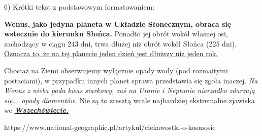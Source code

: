 6) Krótki tekst z podstawowym formatowaniem:

\textbf{Wenus, jako jedyna planeta w Układzie Słonecznym, obraca się wstecznie do kierunku Słońca.} Ponadto jej obrót wokół własnej osi, zachodzący w ciągu 243 dni, trwa dłużej niż obrót wokół Słońca (225 dni). \underline{Oznacza to, że na tej planecie jeden dzień jest dłuższy niż jeden rok.}

Chociaż na Ziemi obserwujemy wyłącznie opady wody (pod rozmaitymi postaciami), w przypadku innych planet sprawa przedstawia się zgoła inaczej. \textit{Na Wenus z nieba pada kwas siarkowy, zaś na Uranie i Neptunie nierzadko zdarzają się... opady diamentów.} Nie są to zresztą wcale najbardziej ekstremalne zjawiska we \textbf{\textit{\underline{Wszechświecie.}}}
 
\begingroup
\raggedleft
https://www.national-geographic.pl/artykul/ciekawostki-o-kosmosie
\endgroup